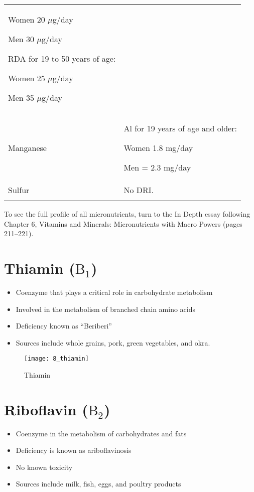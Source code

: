 \documentclass[title={Chapter 8}]{fdsn201notes}
\begin{document}
\begin{table}[H]
\begin{threeparttable}
\begin{tabular}{p{} p{}}
			Women 20 $\mu$g/day
			
			Men 30 $\mu$g/day

			RDA for 19 to 50 years of age:

			Women 25 $\mu$g/day

			Men 35 $\mu$g/day\\
			Manganese & Al for 19 years of age and older:
			
			Women 1.8 mg/day
			
			Men = 2.3 mg/day\\
			Sulfur & No DRI.\\
			\rowcolor{rowdarkgreen} & \\
		\end{tabular}
		\begin{tablenotes}
			\small
			\item To see the full profile of all micronutrients, turn to the In Depth essay following Chapter 6, Vitamins and Minerals: Micronutrients with Macro Powers (pages 211--221).
		\end{tablenotes}
	\end{threeparttable}
\end{table}

\section{Thiamin ($\mbox{B}_{1}$)}\label{sec:thiamin}
\begin{itemize}
	\item Coenzyme that plays a critical role in carbohydrate metabolism
	\item Involved in the metabolism of branched chain amino acids
	\item Deficiency known as ``Beriberi''
	\item Sources include whole grains, pork, green vegetables, and okra.
\end{itemize}

\begin{figure}[H]
	\centering
	\texttt{[image: 8\_thiamin]}
	\caption{Thiamin}
	\label{fig:thiamin}
\end{figure}

\section{Riboflavin ($\mbox{B}_{2}$)}\label{sec:riboflavin}
\begin{itemize}
	\item Coenzyme in the metabolism of carbohydrates and fats
	\item Deficiency is known as ariboflavinosis
	\item No known toxicity
	\item Sources include milk, fish, eggs, and poultry products
\end{itemize}
\end{document}
